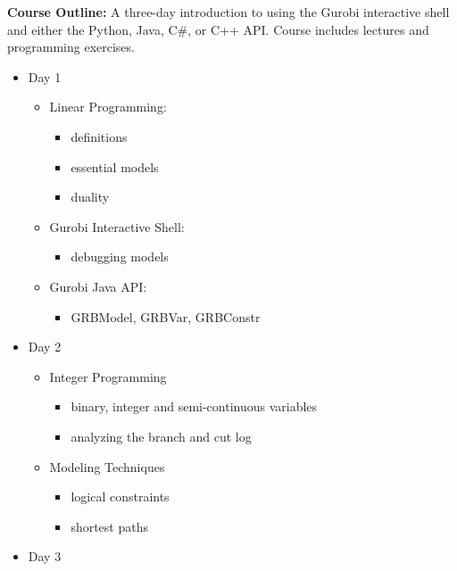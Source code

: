 \documentclass[12pt]{article}
\begin{document}
\noindent \textbf{Course Outline:} 
A three-day introduction to using the Gurobi
interactive shell and either the Python, Java, C\#, or C++ API.  
Course includes lectures and programming exercises.
\begin{center} \begin{minipage}{5in}
    \begin{flushleft}
      \begin{itemize}
      \item Day 1
        \begin{itemize}
        \item Linear Programming:
          \begin{itemize}
          \item definitions
          \item essential models
          \item duality
          \end{itemize}
        \item Gurobi Interactive Shell:
          \begin{itemize}
          \item debugging models
          \end{itemize}
        \item Gurobi Java API:
          \begin{itemize}
          \item GRBModel, GRBVar, GRBConstr
          \end{itemize}
        \end{itemize}
      \item Day 2
        \begin{itemize}
           \item Integer Programming
             \begin{itemize}
               \item binary, integer and semi-continuous variables
               \item analyzing the branch and cut log
             \end{itemize}
           \item Modeling Techniques
             \begin{itemize}
             \item logical constraints
             \item shortest paths
             \end{itemize}
        \end{itemize}
      \item Day 3

\end{itemize}
\end{flushleft}
\end{minipage}
\end{center}
\end{document}
